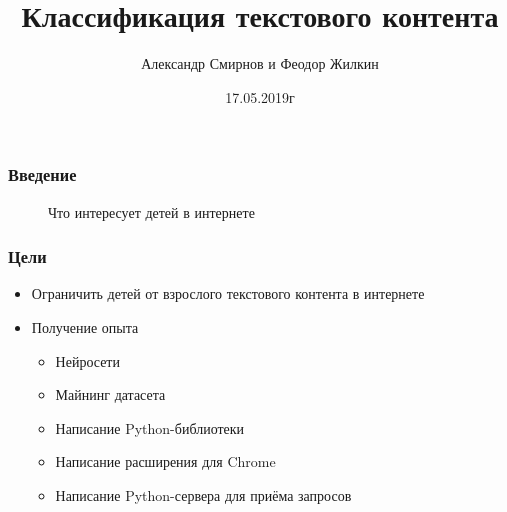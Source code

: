 \documentclass[xetex,mathserif,serif]{beamer}
\title{Классификация текстового контента}
\author{Александр Смирнов и Феодор Жилкин}
\date{17.05.2019г}
\begin{document}
	\frame{\titlepage}

	\begin{frame}
		\frametitle{Введение}
		\begin{figure}[h]
            \caption{Что интересует детей в интернете}
            \label{fig:image}
        \end{figure}
	\end{frame}
	
	\begin{frame}
		\frametitle{Цели}
			\begin{itemize}
		 		\item Ограничить детей от взрослого текстового контента в интернете
				\item Получение опыта
    				\begin{itemize}
    			    	\item Нейросети
    			    	\item Майнинг датасета
    			    	\item Написание Python-библиотеки
    			    	\item Написание расширения для Chrome
    			    	\item Написание Python-сервера для приёма запросов
    		    	\end{itemize}
			\end{itemize}
	\end{frame}
	
\end{document}
